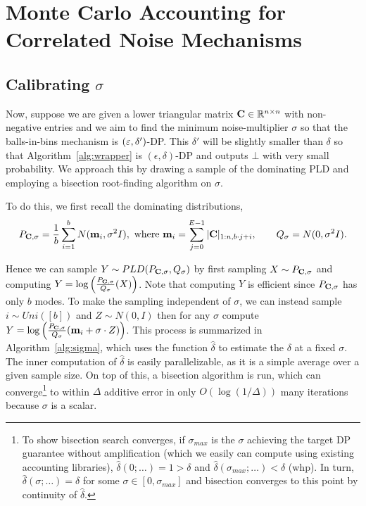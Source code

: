\section{Monte Carlo Accounting for Correlated Noise Mechanisms}\label{sec:mcmm}

\subsection{Calibrating $\sigma$}

Now, suppose we are given a lower triangular matrix $\mathbf{C} \in \mathbb{R}^{n \times n}$ with non-negative entries and we aim to find the minimum noise-multiplier $\sigma$ so that the balls-in-bins mechanism is $(\varepsilon, \delta')$-DP.
This $\delta'$ will be slightly smaller than $\delta$ so that Algorithm~\ref{alg:wrapper} is $(\epsilon, \delta)$-DP and outputs $\bot$ with very small probability.
We approach this by drawing a sample of the dominating PLD and employing a bisection root-finding algorithm on $\sigma$.

To do this, we first recall the dominating distributions,
\[ P_{\mathbf{C},\sigma} = \frac{1}{b}\sum_{i=1}^{b} N(\mathbf{m}_i, \sigma^2 I), \text{ where } \mathbf{m}_i = \sum_{j=0}^{E-1} |\mathbf{C}|_{1:n, b\cdot j + i}, \qquad Q_{\sigma} = N(0, \sigma^2 I).\]

Hence we can sample $Y \sim PLD(P_{\mathbf{C}, \sigma}, Q_\sigma)$ by first sampling $X \sim P_{\mathbf{C},\sigma}$ and computing $Y = \log \left(\frac{P_{\mathbf{C},\sigma}}{Q_\sigma}(X)\right)$. Note that computing $Y$ is efficient since $P_{\mathbf{C},\sigma}$ has only $b$ modes.
To make the sampling independent of $\sigma$, we can instead sample $i\sim Uni([b])$ and $Z \sim N(0, I)$ then for any $\sigma$ compute $Y = \log \left(\frac{P_{\mathbf{C},\sigma}}{Q_\sigma}(\mathbf{m}_i + \sigma \cdot Z)\right)$.
This process is summarized in Algorithm~\ref{alg:sigma}, which uses the function  $\hat{\delta}$ to estimate the $\delta$ at a fixed $\sigma$.
The inner computation of $\hat{\delta}$ is easily parallelizable, as it is a simple average over a given sample size.
On top of this, a bisection algorithm is run, which can converge\footnote{To show bisection search converges, if $\sigma_{max}$ is the $\sigma$ achieving the target DP guarantee without amplification (which we easily can compute using existing accounting libraries), $\hat{\delta}(0; \ldots) = 1 > \delta$ and $\hat{\delta}(\sigma_{max}; \ldots) < \delta$ (whp). In turn, $\hat{\delta}(\sigma; \ldots) = \delta$ for some $\sigma \in [0, \sigma_{max}]$ and bisection converges to this point by continuity of $\hat{\delta}$.} to within $\Delta$ additive error in only $O(\log(1/\Delta))$ many iterations because $\sigma$ is a scalar. 

